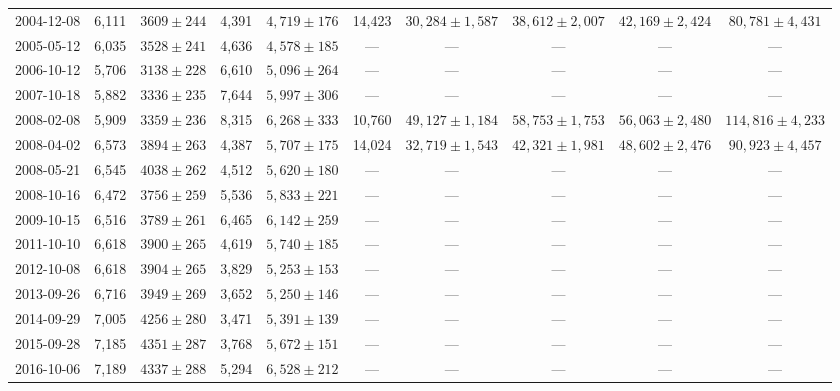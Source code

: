 \begin{landscape}
\begin{longtable}{cccccccccc}
{2004-12-08} & 6,111 & {$3609  \pm  244$} & 4,391 & {$4,719 \pm 176$} & 14,423 & {$30,284 \pm 1,587$} & {$38,612 \pm 2,007$} & {$42,169 \pm 2,424$} & {$80,781 \pm 4,431$} \\
{2005-05-12} & 6,035 & {$3528  \pm  241$} & 4,636 & {$4,578 \pm 185$} & --- & --- & --- & --- & --- \\
{2006-10-12} & 5,706 & {$3138  \pm  228$} & 6,610 & {$5,096 \pm 264$} & --- & --- & --- & --- & --- \\
{2007-10-18} & 5,882 & {$3336  \pm  235$} & 7,644 & {$5,997 \pm 306$} & --- & --- & --- & --- & --- \\
{2008-02-08} & 5,909 & {$3359  \pm  236$} & 8,315 & {$6,268 \pm 333$} & 10,760 & {$49,127 \pm 1,184$} & {$58,753 \pm 1,753$} & {$56,063 \pm 2,480$} & {$114,816 \pm 4,233$} \\
{2008-04-02} & 6,573 & {$3894  \pm  263$} & 4,387 & {$5,707 \pm 175$} & 14,024 & {$32,719 \pm 1,543$} & {$42,321 \pm 1,981$} & {$48,602 \pm 2,476$} & {$90,923 \pm 4,457$} \\
{2008-05-21} & 6,545 & {$4038  \pm  262$} & 4,512 & {$5,620 \pm 180$} & --- & --- & --- & --- & --- \\
{2008-10-16} & 6,472 & {$3756  \pm  259$} & 5,536 & {$5,833 \pm 221$} & --- & --- & --- & --- & --- \\
{2009-10-15} & 6,516 & {$3789  \pm  261$} & 6,465 & {$6,142 \pm 259$} & --- & --- & --- & --- & --- \\
{2011-10-10} & 6,618 & {$3900  \pm  265$} & 4,619 & {$5,740 \pm 185$} & --- & --- & --- & --- & --- \\
{2012-10-08} & 6,618 & {$3904  \pm  265$} & 3,829 & {$5,253 \pm 153$} & --- & --- & --- & --- & --- \\
{2013-09-26} & 6,716 & {$3949  \pm  269$} & 3,652 & {$5,250 \pm 146$} & --- & --- & --- & --- & --- \\
{2014-09-29} & 7,005 & {$4256  \pm  280$} & 3,471 & {$5,391 \pm 139$} & --- & --- & --- & --- & --- \\
{2015-09-28} & 7,185 & {$4351  \pm  287$} & 3,768 & {$5,672 \pm 151$} & --- & --- & --- & --- & --- \\
{2016-10-06} & 7,189 & {$4337  \pm  288$} & 5,294 & {$6,528 \pm 212$} & --- & --- & --- & --- & --- \\
\end{longtable} 
\end{landscape} 
